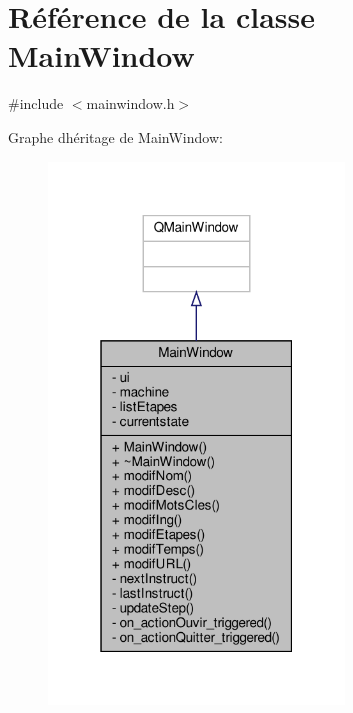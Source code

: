 \hypertarget{classMainWindow}{}\section{Référence de la classe Main\+Window}
\label{classMainWindow}


{\ttfamily \#include $<$mainwindow.\+h$>$}



Graphe d\textquotesingle{}héritage de Main\+Window\+:\nopagebreak
\begin{figure}[H]
\begin{center}
\leavevmode
\includegraphics[width=223pt]{classMainWindow__inherit__graph}
\end{center}
\end{figure}


